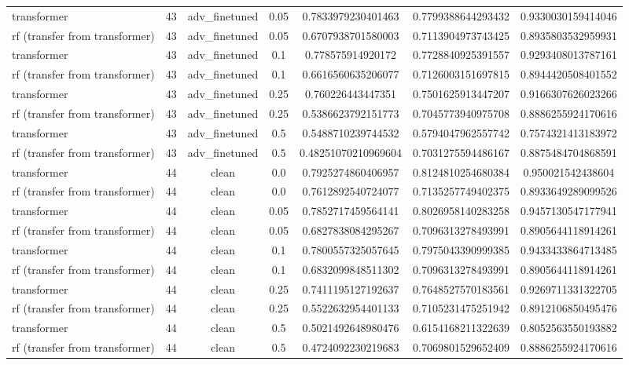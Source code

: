 \begin{table}[htbp]
\begin{tabular}{lcccccc}
transformer & 43 & adv\_finetuned & 0.05 & 0.7833979230401463 & 0.7799388644293432 & 0.9330030159414046 \\
rf (transfer from transformer) & 43 & adv\_finetuned & 0.05 & 0.6707938701580003 & 0.7113904973743425 & 0.8935803532959931 \\
transformer & 43 & adv\_finetuned & 0.1 & 0.778575914920172 & 0.7728840925391557 & 0.9293408013787161 \\
rf (transfer from transformer) & 43 & adv\_finetuned & 0.1 & 0.6616560635206077 & 0.7126003151697815 & 0.8944420508401552 \\
transformer & 43 & adv\_finetuned & 0.25 & 0.760226443447351 & 0.7501625913447207 & 0.9166307626023266 \\
rf (transfer from transformer) & 43 & adv\_finetuned & 0.25 & 0.5386623792151773 & 0.7045773940975708 & 0.8886255924170616 \\
transformer & 43 & adv\_finetuned & 0.5 & 0.5488710239744532 & 0.5794047962557742 & 0.7574321413183972 \\
rf (transfer from transformer) & 43 & adv\_finetuned & 0.5 & 0.48251070210969604 & 0.7031275594486167 & 0.8875484704868591 \\
transformer & 44 & clean & 0.0 & 0.7925274860406957 & 0.8124810254680384 & 0.950021542438604 \\
rf (transfer from transformer) & 44 & clean & 0.0 & 0.7612892540724077 & 0.7135257749402375 & 0.8933649289099526 \\
transformer & 44 & clean & 0.05 & 0.7852717459564141 & 0.8026958140283258 & 0.9457130547177941 \\
rf (transfer from transformer) & 44 & clean & 0.05 & 0.6827838084295267 & 0.7096313278493991 & 0.8905644118914261 \\
transformer & 44 & clean & 0.1 & 0.7800557325057645 & 0.7975043390999385 & 0.9433433864713485 \\
rf (transfer from transformer) & 44 & clean & 0.1 & 0.6832099848511302 & 0.7096313278493991 & 0.8905644118914261 \\
transformer & 44 & clean & 0.25 & 0.7411195127192637 & 0.7648527570183561 & 0.9269711331322705 \\
rf (transfer from transformer) & 44 & clean & 0.25 & 0.5522632954401133 & 0.7105231475251942 & 0.8912106850495476 \\
transformer & 44 & clean & 0.5 & 0.5021492648980476 & 0.6154168211322639 & 0.8052563550193882 \\
rf (transfer from transformer) & 44 & clean & 0.5 & 0.4724092230219683 & 0.7069801529652409 & 0.8886255924170616 \\

\end{tabular}
\end{table}
